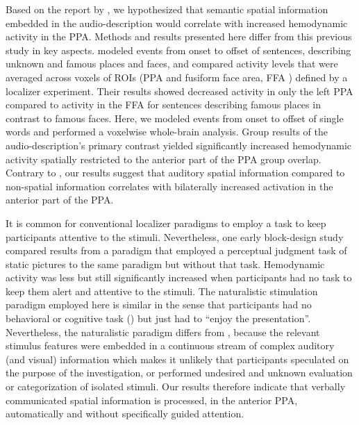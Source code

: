 \documentclass[english,11pt]{article}
\begin{document}
Based on the report by \citet{aziz2008modulation}, we hypothesized that semantic
spatial information embedded in the audio-description would correlate with
increased hemodynamic activity in the PPA.
%
Methods and results presented here differ from this previous study in key
aspects.
\citet{aziz2008modulation} modeled events from onset to offset of sentences,
describing unknown and famous places and faces, and compared activity levels
that were averaged across voxels of ROIs (PPA and fusiform face area, FFA
\citep{kanwisher1997ffa}) defined by a localizer experiment.
Their results showed decreased activity in only the left PPA
compared to activity in the FFA for sentences describing famous places in contrast
to famous faces.
Here, we modeled events from onset to offset of single words and performed a
voxelwise whole-brain analysis.
Group results of the audio-description's primary contrast yielded significantly
increased hemodynamic activity spatially restricted to the anterior part of the
PPA group overlap.
Contrary to \citet{aziz2008modulation}, our results suggest that auditory
spatial information compared to non-spatial information correlates with
bilaterally increased activation in the anterior part of the PPA.

It is common for conventional localizer paradigms to employ a task to keep
participants attentive to the stimuli.
Nevertheless, one early block-design study \citep{epstein1998ppa} compared
results from a paradigm that employed a perceptual judgment task of static
pictures to the same paradigm but without that task.
Hemodynamic activity was less but still significantly increased when
participants had no task to keep them alert and attentive to the stimuli.
The naturalistic stimulation paradigm employed here is similar in the sense that
participants had no behavioral or cognitive task (\citep[e.g., forming a mental
image of the stimuli][]{ocraven2000mental})
 but just had to ``enjoy the presentation''.
Nevertheless, the naturalistic paradigm differs from \citet{epstein1998ppa},
because the relevant stimulus features were embedded in a continuous stream of
complex auditory (and visual) information which makes it unlikely that
participants speculated on the purpose of the investigation, or performed
undesired and unknown evaluation or categorization of isolated stimuli.
Our results therefore indicate that verbally communicated spatial information is
processed, in the anterior PPA, automatically and without specifically guided
attention.
\end{document}
